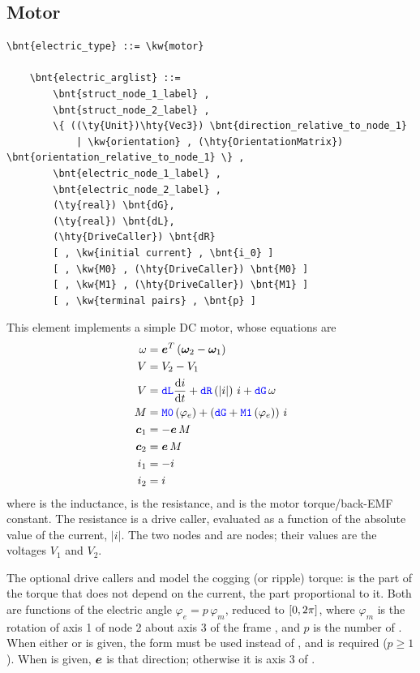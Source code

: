 \subsection{Motor}
\begin{Verbatim}[commandchars=\\\{\}]
    \bnt{electric_type} ::= \kw{motor}

    \bnt{electric_arglist} ::=
        \bnt{struct_node_1_label} ,
        \bnt{struct_node_2_label} ,
        \{ ((\ty{Unit})\hty{Vec3}) \bnt{direction_relative_to_node_1}
            | \kw{orientation} , (\hty{OrientationMatrix}) \bnt{orientation_relative_to_node_1} \} ,
        \bnt{electric_node_1_label} ,
        \bnt{electric_node_2_label} ,
        (\ty{real}) \bnt{dG},
        (\ty{real}) \bnt{dL},
        (\hty{DriveCaller}) \bnt{dR}
        [ , \kw{initial current} , \bnt{i_0} ]
        [ , \kw{M0} , (\hty{DriveCaller}) \bnt{M0} ]
        [ , \kw{M1} , (\hty{DriveCaller}) \bnt{M1} ]
        [ , \kw{terminal pairs} , \bnt{p} ]       
\end{Verbatim}
This element implements a simple DC motor, whose equations are
\begin{subequations}
\begin{align}
	\omega &= \boldsymbol{e}^T \left( \boldsymbol{\omega}_2 - \boldsymbol{\omega}_1 \right) \\
	V &= V_2 - V_1 \\
    V &= \textcolor{blue}{\texttt{dL}} \frac{\mathrm{d}i}{\mathrm{d}t} + \textcolor{blue}{\texttt{dR}}\left( \left| i \right| \right) \, i + \textcolor{blue}{\texttt{dG}} \, \omega \\
	M &= \textcolor{blue}{\texttt{M0}}\left( \varphi_e \right) + \left( \textcolor{blue}{\texttt{dG}} + \textcolor{blue}{\texttt{M1}}\left( \varphi_e \right) \right) \, i \\
	\boldsymbol{c}_1 &= - \boldsymbol{e} \, M \\
	\boldsymbol{c}_2 &= \boldsymbol{e} \, M \\
	i_1 &= -i \\
	i_2 &= i
\end{align}
\end{subequations}
where  is the inductance,  is the resistance, and  is the motor torque/back-EMF constant.
The resistance  is a drive caller, evaluated as a function
of the absolute value of the current, $\left| i \right|$.
The two nodes  and 
are  nodes; their values are the voltages $V_1$ and $V_2$.

The optional drive callers  and  model the cogging
(or ripple) torque:  is the part of the torque that does not
depend on the current,  the part proportional to it.
Both are functions of the electric angle $\varphi_e = p \, \varphi_m$,
reduced to $\left[ 0, 2\pi \right]$, where $\varphi_m$ is the rotation of axis 1
of node 2 about axis 3 of the frame ,
and $p$ is the number of .
When either  or  is given, the  form
must be used instead of ,
and  is required ($p \ge 1$).
When  is given,
$\boldsymbol{e}$ is that direction; otherwise it is axis 3 of
.

